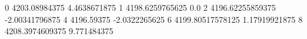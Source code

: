 0 4203.08984375 4.4638671875
1 4198.6259765625 0.0
2 4196.62255859375 -2.00341796875
4 4196.59375 -2.0322265625
6 4199.80517578125 1.17919921875
8 4208.3974609375 9.771484375
